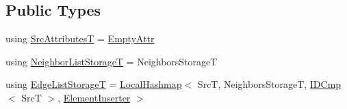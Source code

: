 \subsection*{Public Types}
\begin{DoxyCompactItemize}
\item 
using \hyperlink{classshad_1_1DefaultEdgeIndexStorage_a70d9110c20e453941e2bfa372463bd92}{Src\-Attributes\-T} = \hyperlink{structshad_1_1DefaultEdgeIndexStorage_1_1EmptyAttr}{Empty\-Attr}
\item 
using \hyperlink{classshad_1_1DefaultEdgeIndexStorage_aae1425fda169243d97fa1e39e4417fa5}{Neighbor\-List\-Storage\-T} = Neighbors\-Storage\-T
\item 
using \hyperlink{classshad_1_1DefaultEdgeIndexStorage_af083de6d56b46413f55dc5fea0384afa}{Edge\-List\-Storage\-T} = \hyperlink{classshad_1_1LocalHashmap}{Local\-Hashmap}$<$ Src\-T, Neighbors\-Storage\-T, \hyperlink{classshad_1_1IDCmp}{I\-D\-Cmp}$<$ Src\-T $>$, \hyperlink{structshad_1_1DefaultEdgeIndexStorage_1_1ElementInserter}{Element\-Inserter} $>$
\end{DoxyCompactItemize}
